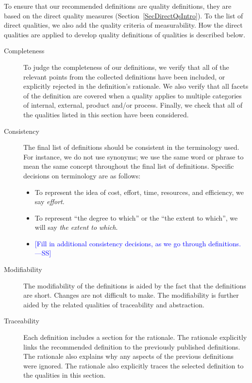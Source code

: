 \documentclass[letterpaper, cleveref]{lipics-v2019}
\newcommand{\authornote}[3]{\textcolor{#1}{[#3 ---#2]}}
\newcommand{\authornote}[3]{}
\newcommand{\wss}[1]{\authornote{blue}{SS}{#1}} %
\theoremstyle{definition}
\begin{document}
To ensure that our recommended definitions are quality definitions, they are
based on the direct quality measures (Section~\ref{SecDirectQsIntro}).  To the
list of direct qualities, we also add the quality criteria of measurability.
How the direct qualities are applied to develop quality definitions of qualities
is described below.

\begin{description}

  \item[Completeness] To judge the completeness of our definitions, we verify
  that all of the relevant points from the collected definitions have been
  included, or explicitly rejected in the definition's rationale.  We also
  verify that all facets of the definition are covered when a quality applies to
  multiple categories of internal, external, product and/or process.  Finally,
  we check that all of the qualities listed in this section have been
  considered.
  
  \item[Consistency] The final list of definitions should be consistent in the
  terminology used.  For instance, we do not use synonyms; we use
  the same word or phrase to mean the same concept throughout the final list of
  definitions.  Specific decisions on terminology are as follows:
  \begin{itemize}
    \item To represent the idea of cost, effort, time, resources, and
    efficiency, we say \emph{effort}.
    \item To represent ``the degree to which'' or the ``the extent to which'',
    we will say \emph{the extent to which}.
    \item \wss{Fill in additional consistency decisions, as we go through
    definitions.}
  \end{itemize}

  \item[Modifiability] The modifiability of the definitions is aided by the fact
  that the definitions are short.  Changes are not difficult to make.  The
  modifiability is further aided by the related qualities of traceability and
  abstraction.

  \item[Traceability] Each definition includes a section for the rationale.  The
  rationale explicitly links the recommended definition to the previously
  published definitions.  The rationale also explains why any aspects of the
  previous definitions were ignored.  The rationale also explicitly traces the
  selected definition to the qualities in this section.


\end{description}
\end{document}

